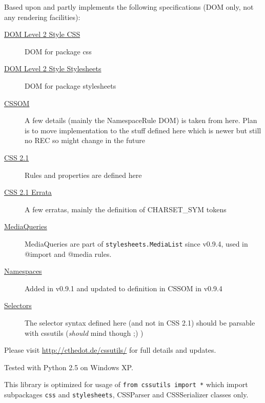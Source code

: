 Based upon and partly implements the following specifications (DOM only, not any rendering facilities):
\begin{description}
\item[{\href{http://www.w3.org/TR/DOM-Level-2-Style/css.html}{DOM Level 2 Style CSS}}] \leavevmode 
DOM for package css

\item[{\href{http://www.w3.org/TR/DOM-Level-2-Style/stylesheets.html}{DOM Level 2 Style Stylesheets}}] \leavevmode 
DOM for package stylesheets

\item[{\href{http://dev.w3.org/csswg/cssom/}{CSSOM}}] \leavevmode 
A few details (mainly the NamespaceRule DOM) is taken from here. Plan is to move implementation to the stuff defined here which is newer but still no REC so might change in the future

\item[{\href{http://www.w3.org/TR/CSS21/}{CSS 2.1}}] \leavevmode 
Rules and properties are defined here

\item[{\href{http://www.w3.org/Style/css2-updates/CR-CSS21-20070719-errata.html}{CSS 2.1 Errata}}] \leavevmode 
A few erratas, mainly the definition of CHARSET{\_}SYM tokens

\item[{\href{http://www.w3.org/TR/css3-mediaqueries/}{MediaQueries}}] \leavevmode 
MediaQueries are part of \texttt{stylesheets.MediaList} since v0.9.4, used in @import and @media rules.

\item[{\href{http://www.w3.org/TR/css3-namespace/}{Namespaces}}] \leavevmode 
Added in v0.9.1 and updated to definition in CSSOM in v0.9.4

\item[{\href{http://www.w3.org/TR/css3-selectors/}{Selectors}}] \leavevmode 
The selector syntax defined here (and not in CSS 2.1) should be parsable with cssutils (\emph{should} mind though ;) )

\end{description}

Please visit \href{http://cthedot.de/cssutils/}{http://cthedot.de/cssutils/} for full details and updates.

Tested with Python 2.5 on Windows XP.

This library is optimized for usage of \texttt{from cssutils import *} which
import subpackages \texttt{css} and \texttt{stylesheets}, CSSParser and
CSSSerializer classes only.

